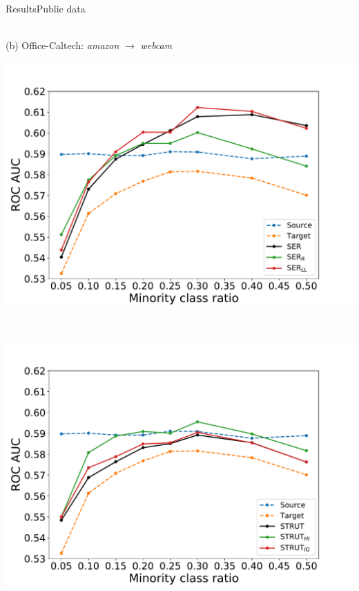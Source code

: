 \documentclass[8pt,t,aspectratio=1610]{beamer}
\newcommand{\ratio}{0.5}
\begin{document}
\begin{frame}[noframenumbering]{Results}{Public data}
\begin{minipage}[t]{0.33\linewidth}
\begin{minipage}[t]{\ratio\linewidth}
            \end{minipage}\\
            \medskip
            {\small(b)\; Office-Caltech: \emph{amazon} $\rightarrow$ \emph{webcam}}
        \end{minipage}\hfill
        \begin{minipage}[t]{0.329\linewidth}\vspace{0pt}
            \centering
            \begin{minipage}[t]{\ratio\linewidth}\vspace{0pt}
            \centerline{\includegraphics[width=\linewidth, trim={0 0 0 50}, clip]{SER_ll_05_Dataoffice_caltech_cal_webcam_Scorefilescores_2020_02_17_8_BALANCESOURCE50_KFOLD5_NTARGET_NB_TREE1_BarPlot_AUC_depthNone.pdf}}
            \end{minipage}\\
            \begin{minipage}[t]{\ratio\linewidth}\vspace{0cm}
            \centerline{\includegraphics[width=\linewidth, trim={0 0 0 40}, clip]{STRUT_Dataoffice_caltech_cal_webcam_Scorefilescores_2020_02_17_8_BALANCESOURCE50_KFOLD5_NTARGET_NB_TREE1_BarPlot_AUC_depthNone_ig.pdf}}

\end{minipage}
\end{minipage}
\end{frame}
\end{document}
